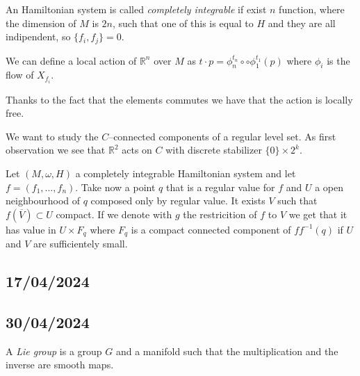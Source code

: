 \documentclass[misc]{subfiles}
\begin{document}
\begin{Dfn}
    An Hamiltonian system is called \textit{completely integrable} if exist $n$ function, where the dimension of $M$ is $2n$, such that one of this is equal to $H$ and they are all indipendent, so $\{f_i,f_j\}=0$.

    We can define a local action of $\mathbb{R}^n$ over $M$ as $t \cdot p=\phi_n^{t_n} \circ \circ \phi_1^{t_1}(p)$ where $\phi_i$ is the flow of $X_{f_i}$.
\end{Dfn}

\begin{Prp}
    Thanks to the fact that the elements commutes we have that the action is locally free.
\end{Prp}

\begin{Exp}
    We want to study the $C$--connected components of a regular level set. As first observation we see that $\mathbb{R}^2$ acts on $C$ with discrete stabilizer $\{0\} \times 2^k$.

    Let $(M,\omega,H)$ a completely integrable Hamiltonian system and let $f=(f_1,\dots,f_n)$. Take now a point $q$ that is a regular value for $f$ and $U$ a open neighbourhood of $q$ composed only by regular value. It exists $V$ such that $f(\overline{V}) \subset U$ compact. If we denote with $g$ the restricition of $f$ to $V$ we get that it has value in $U \times F_q$ where $F_q$ is a compact connected component of $ff^{-1}(q)$ if $U$ and $V$ are sufficientely small.
\end{Exp}

\subsection*{17/04/2024}

\subsection*{30/04/2024}

\begin{Dfn}\label{Dfn: Lie group}
    A \emph{Lie group} is a group $G$ and a manifold such that the multiplication and the inverse are smooth maps.
\end{Dfn}
\end{document}

